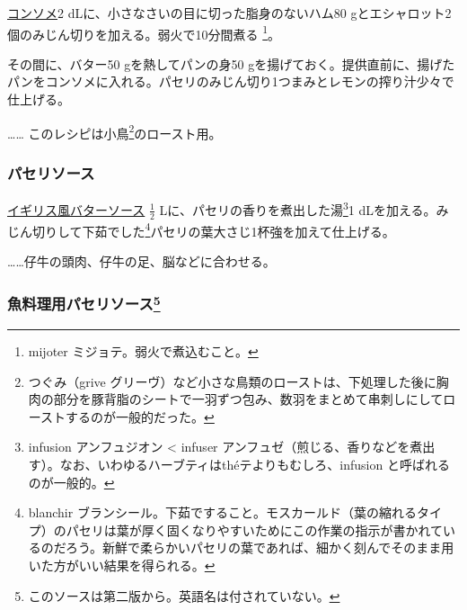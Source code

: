 \begin{recette}
\protect\hyperlink{consomme-blanc-simple}{コンソメ}2
dLに、小さなさいの目に切った脂身のないハム80
gとエシャロット2個のみじん切りを加える。弱火で10分間煮る \footnote{mijoter
  ミジョテ。弱火で煮込むこと。}。

その間に、バター50 gを熱してパンの身50
gを揚げておく。提供直前に、揚げたパンをコンソメに入れる。パセリのみじん切り1つまみとレモンの搾り汁少々で仕上げる。

\ldots{}\ldots{} このレシピは小鳥\footnote{つぐみ（grive
  グリーヴ）など小さな鳥類のローストは、下処理した後に胸肉の部分を豚背脂のシートで一羽ずつ包み、数羽をまとめて串刺しにしてローストするのが一般的だった。}のロースト用。

\atoaki{}

\hypertarget{perseley-sauce}{%
\subsubsection{パセリソース}\label{perseley-sauce}}



\protect\hyperlink{bread-sauce}{イギリス風バターソース} \(\frac{1}{2}\)
Lに、パセリの香りを煮出した湯\footnote{infusion アンフュジオン
  \textless{} infuser
  アンフュゼ（煎じる、香りなどを煮出す）。なお、いわゆるハーブティはthéテよりもむしろ、infusion
  と呼ばれるのが一般的。}1
dLを加える。みじん切りして下茹でした\footnote{blanchir
  ブランシール。下茹ですること。モスカールド（葉の縮れるタイプ）のパセリは葉が厚く固くなりやすいためにこの作業の指示が書かれているのだろう。新鮮で柔らかいパセリの葉であれば、細かく刻んでそのまま用いた方がいい結果を得られる。}パセリの葉大さじ1杯強を加えて仕上げる。

\ldots{}\ldots{}仔牛の頭肉、仔牛の足、脳などに合わせる。

\atoaki{}

\hypertarget{ux9b5aux6599ux7406ux7528ux30d1ux30bbux30eaux30bdux30fcux30b945bis}{%
\subsubsection[魚料理用パセリソース]{\texorpdfstring{魚料理用パセリソース\footnote{このソースは第二版から。英語名は付されていない。}}{魚料理用パセリソース}}\label{ux9b5aux6599ux7406ux7528ux30d1ux30bbux30eaux30bdux30fcux30b945bis}}


\end{recette}
